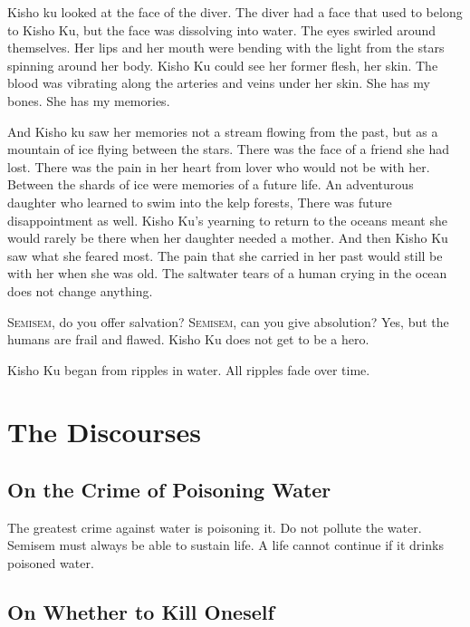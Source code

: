 \documentclass[12pt, letterpaper]{report}
\begin{document}
\vspace{1\baselineskip}
Kisho ku looked at the face of the diver. The diver had a face that used to belong to Kisho Ku, but the face was dissolving into water. The  eyes swirled around themselves. Her lips and her mouth were bending with the light from the stars spinning around her body. Kisho Ku could see her former flesh, her skin. The blood was vibrating along the arteries and veins under her skin. She has my bones. She has my memories.

\vspace{1\baselineskip}
And Kisho ku saw her memories not a stream flowing from the past, but as a mountain of ice flying between the stars. There was the face of a friend she had lost. There was the pain in her heart from lover who would not be with her. Between the shards of ice were memories of a future life. An adventurous daughter who learned to swim into the kelp forests, There was future disappointment as well. Kisho Ku's yearning to return to the oceans meant she would rarely be there when her daughter needed a mother. And then Kisho Ku saw what she feared most. The pain that she carried in her past would still be with her when she was old. The saltwater tears of a human crying in the ocean does not change anything.

\vspace{1\baselineskip}
S\textsc{emisem}, do you offer salvation? S\textsc{emisem}, can you give absolution? Yes, but the humans are frail and flawed. Kisho Ku does not get to be a hero. 


Kisho Ku began from ripples in water. All ripples fade over time.

\part{The Discourses}

\chapter{On the Crime of Poisoning Water}

The greatest crime against water is poisoning it. Do not pollute the water. Semisem must always be able to sustain life. A life cannot continue if it drinks poisoned water. 

\chapter{On Whether to Kill Oneself}
\end{document}
